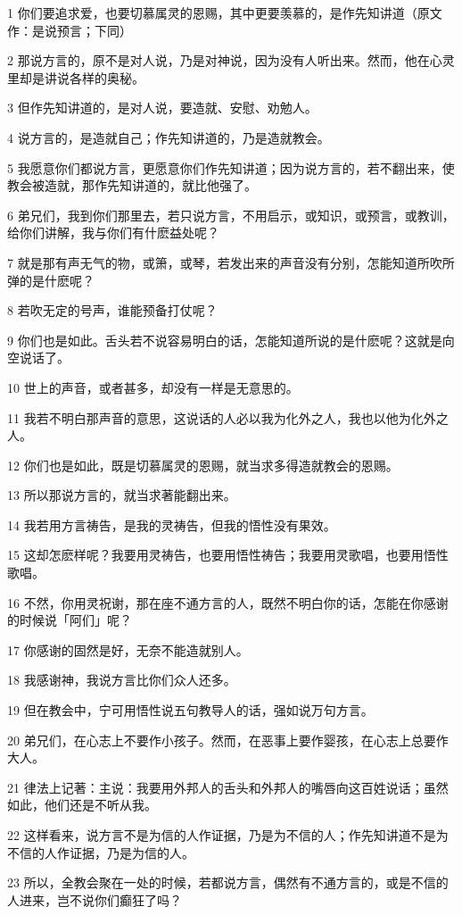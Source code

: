 \par 1 你们要追求爱，也要切慕属灵的恩赐，其中更要羡慕的，是作先知讲道（原文作：是说预言；下同）
\par 2 那说方言的，原不是对人说，乃是对神说，因为没有人听出来。然而，他在心灵里却是讲说各样的奥秘。
\par 3 但作先知讲道的，是对人说，要造就、安慰、劝勉人。
\par 4 说方言的，是造就自己；作先知讲道的，乃是造就教会。
\par 5 我愿意你们都说方言，更愿意你们作先知讲道；因为说方言的，若不翻出来，使教会被造就，那作先知讲道的，就比他强了。
\par 6 弟兄们，我到你们那里去，若只说方言，不用启示，或知识，或预言，或教训，给你们讲解，我与你们有什麽益处呢？
\par 7 就是那有声无气的物，或箫，或琴，若发出来的声音没有分别，怎能知道所吹所弹的是什麽呢？
\par 8 若吹无定的号声，谁能预备打仗呢？
\par 9 你们也是如此。舌头若不说容易明白的话，怎能知道所说的是什麽呢？这就是向空说话了。
\par 10 世上的声音，或者甚多，却没有一样是无意思的。
\par 11 我若不明白那声音的意思，这说话的人必以我为化外之人，我也以他为化外之人。
\par 12 你们也是如此，既是切慕属灵的恩赐，就当求多得造就教会的恩赐。
\par 13 所以那说方言的，就当求著能翻出来。
\par 14 我若用方言祷告，是我的灵祷告，但我的悟性没有果效。
\par 15 这却怎麽样呢？我要用灵祷告，也要用悟性祷告；我要用灵歌唱，也要用悟性歌唱。
\par 16 不然，你用灵祝谢，那在座不通方言的人，既然不明白你的话，怎能在你感谢的时候说「阿们」呢？
\par 17 你感谢的固然是好，无奈不能造就别人。
\par 18 我感谢神，我说方言比你们众人还多。
\par 19 但在教会中，宁可用悟性说五句教导人的话，强如说万句方言。
\par 20 弟兄们，在心志上不要作小孩子。然而，在恶事上要作婴孩，在心志上总要作大人。
\par 21 律法上记著：主说：我要用外邦人的舌头和外邦人的嘴唇向这百姓说话；虽然如此，他们还是不听从我。
\par 22 这样看来，说方言不是为信的人作证据，乃是为不信的人；作先知讲道不是为不信的人作证据，乃是为信的人。
\par 23 所以，全教会聚在一处的时候，若都说方言，偶然有不通方言的，或是不信的人进来，岂不说你们癫狂了吗？
